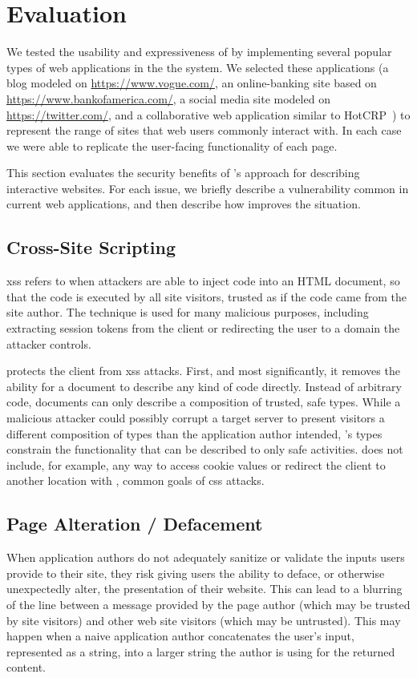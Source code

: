 \section{Evaluation}
\label{future-web:evaluation}

We tested the usability and expressiveness of \CDF by implementing several
popular types of web applications in the the system.  We selected these
applications (a blog modeled on \url{https://www.vogue.com/}, an online-banking
site based on \url{https://www.bankofamerica.com/}, a social media site modeled
on \url{https://twitter.com/}, and a collaborative web application similar to
HotCRP~\cite{hotCRPhomepage}) to represent the range of sites that web users
commonly interact with.  In each case we were able to replicate the user-facing
functionality of each page.

This section evaluates the security benefits of \CDF's approach for describing
interactive websites.  For each issue, we briefly
describe a vulnerability common in current web applications, and then
describe how \CDF improves the situation.


\subsection{Cross-Site Scripting}
\gls{xss} refers to when attackers are able to inject \JS code
into an HTML document, so that the code is executed by all site visitors, trusted
as if the code came from the site author.  The technique is used for many
malicious purposes, including extracting session tokens from the client or
redirecting the user to a domain the attacker controls.

\CDF protects the client from \gls{xss} attacks.  First, and most significantly,
it removes the ability for a document to describe any kind of \JS code
directly.  Instead of arbitrary code, \CDF documents can only describe a
composition of trusted, safe types.  While a malicious attacker could possibly
corrupt a target server to present visitors a different composition of types
than the application author intended, \CDF's types constrain the functionality
that can be described to only safe activities.  \CDF does not include, for
example, any way to access cookie values or redirect the client to
another location with \JS, common goals of \gls{css} attacks.


\subsection{Page Alteration / Defacement}
When application authors do not adequately sanitize or validate the inputs
users provide to their site, they risk giving users the ability to deface, or
otherwise unexpectedly alter, the presentation of their website.  This
can lead to a blurring of the line between a message provided by the page
author (which may be trusted by site visitors) and other web site visitors
(which may be untrusted).  This may happen when a naive application
author concatenates the user's input, represented
as a string, into a larger string the author is using for the returned
content.

